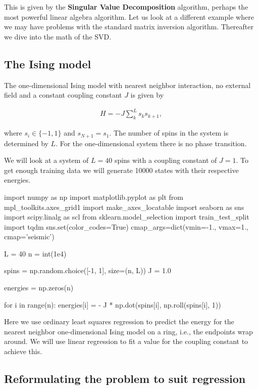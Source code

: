 \documentclass[%
oneside,                 %
final,                   %
10pt]{article}
\begin{document}
This is given by the \textbf{Singular Value Decomposition} algorithm, perhaps
the most powerful linear algebra algorithm.  Let us look at a
different example where we may have problems with the standard matrix
inversion algorithm. Thereafter we dive into the math of the SVD.



\subsection{The Ising model}

The one-dimensional Ising model with nearest neighbor interaction, no
external field and a constant coupling constant $J$ is given by

\begin{align}
    H = -J \sum_{k}^L s_k s_{k + 1},
\end{align}

where $s_i \in \{-1, 1\}$ and $s_{N + 1} = s_1$. The number of spins
in the system is determined by $L$. For the one-dimensional system
there is no phase transition.

We will look at a system of $L = 40$ spins with a coupling constant of
$J = 1$. To get enough training data we will generate 10000 states
with their respective energies.


\bpycod
import numpy as np
import matplotlib.pyplot as plt
from mpl_toolkits.axes_grid1 import make_axes_locatable
import seaborn as sns
import scipy.linalg as scl
from sklearn.model_selection import train_test_split
import tqdm
sns.set(color_codes=True)
cmap_args=dict(vmin=-1., vmax=1., cmap='seismic')

L = 40
n = int(1e4)

spins = np.random.choice([-1, 1], size=(n, L))
J = 1.0

energies = np.zeros(n)

for i in range(n):
    energies[i] = - J * np.dot(spins[i], np.roll(spins[i], 1))
\epycod

Here we use ordinary least squares
regression to predict the energy for the nearest neighbor
one-dimensional Ising model on a ring, i.e., the endpoints wrap
around. We will use linear regression to fit a value for
the coupling constant to achieve this.

\subsection{Reformulating the problem to suit regression}
\end{document}
